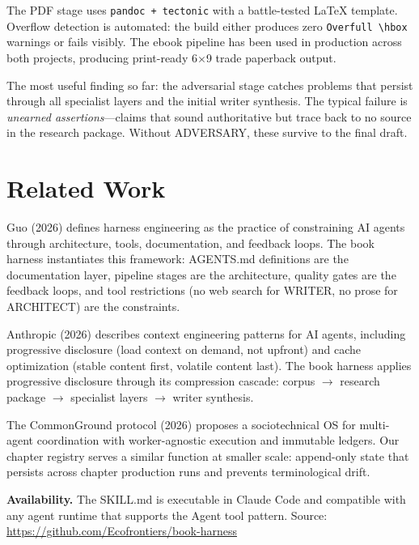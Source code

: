 \documentclass[11pt]{article}
\begin{document}
The PDF stage uses \texttt{pandoc + tectonic} with a battle-tested LaTeX template.
Overflow detection is automated: the build either produces zero \texttt{Overfull
\textbackslash hbox} warnings or fails visibly. The ebook pipeline has been used
in production across both projects, producing print-ready 6$\times$9 trade paperback
output.

The most useful finding so far: the adversarial stage catches problems that persist
through all specialist layers and the initial writer synthesis. The typical failure
is \textit{unearned assertions}---claims that sound authoritative but trace back
to no source in the research package. Without ADVERSARY, these survive to the
final draft.

\section{Related Work}

Guo (2026) defines harness engineering as the practice of constraining AI agents through
architecture, tools, documentation, and feedback loops. The book harness instantiates
this framework: AGENTS.md definitions are the documentation layer, pipeline stages are
the architecture, quality gates are the feedback loops, and tool restrictions (no web
search for WRITER, no prose for ARCHITECT) are the constraints.

Anthropic (2026) describes context engineering patterns for AI agents, including progressive
disclosure (load context on demand, not upfront) and cache optimization (stable content
first, volatile content last). The book harness applies progressive disclosure through
its compression cascade: corpus $\rightarrow$ research package $\rightarrow$ specialist
layers $\rightarrow$ writer synthesis.

The CommonGround protocol (2026) proposes a sociotechnical OS for multi-agent coordination
with worker-agnostic execution and immutable ledgers. Our chapter registry serves a
similar function at smaller scale: append-only state that persists across chapter
production runs and prevents terminological drift.

\vspace{1em}
\noindent\textbf{Availability.} The SKILL.md is executable in Claude Code and compatible
with any agent runtime that supports the Agent tool pattern. Source:
\url{https://github.com/Ecofrontiers/book-harness}
\end{document}
